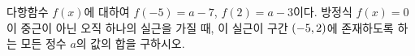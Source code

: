 다항함수 $f(x)$에 대하여 $f(-5)=a-7$, $f(2)=a-3$이다. 방정식 $f(x)=0$이 중근이 아닌 오직 하나의 실근을 가질 때, 이 실근이 구간 $(-5{,}\mkern3mu\mathopen{}2)$에 존재하도록 하는 모든 정수 $a$의 값의 합을 구하시오.
